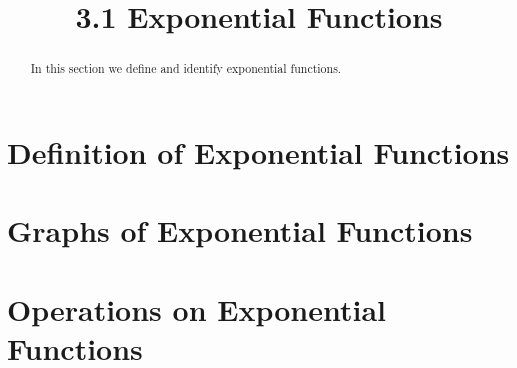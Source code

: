 \documentclass[handout]{ximera}
\title{3.1 Exponential Functions}
\begin{document}
\begin{abstract}
In this section we define and identify exponential functions.
\end{abstract}

\maketitle


\section{Definition of Exponential Functions}




\section{Graphs of Exponential Functions}


\section{Operations on Exponential Functions}
\end{document}
